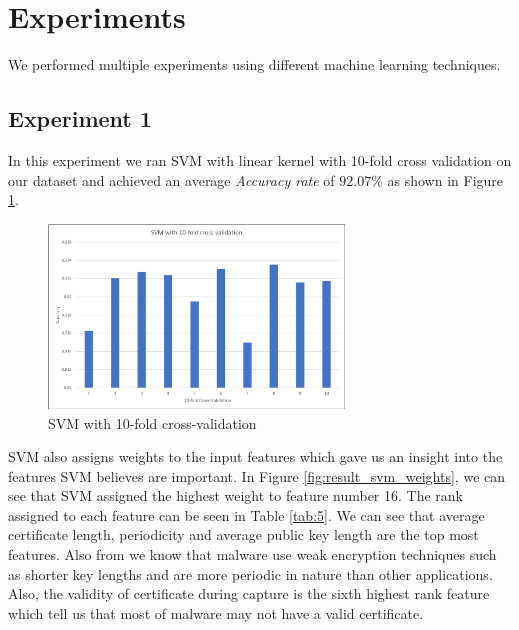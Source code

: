 \clearpage

\section{Experiments}

We performed multiple experiments using different machine learning techniques.

\subsection{Experiment 1}

In this experiment we ran SVM with linear kernel with 10-fold cross validation on our dataset and achieved an average \emph{Accuracy rate} of $92.07$\% as shown in Figure \ref{fig:result_svm}.

\begin{figure}[htb]
	\centering
	\includegraphics[width=0.7\textwidth]{images/svm.png}
	\caption{SVM with 10-fold cross-validation} 
	\label{fig:result_svm}
\end{figure}

SVM also assigns weights to the input features which gave us an insight into the features SVM believes are important. In Figure \ref{fig:result_svm_weights}, we can see that SVM assigned the highest weight to feature number 16. The rank assigned to each feature can be seen in Table \ref{tab:5}. We can see that average certificate length, periodicity and average public key length are the top most features. Also from \cite{AndersonM16} we know that malware use weak encryption techniques such as shorter key lengths and are more periodic in nature than other applications. Also, the validity of certificate during capture is the sixth highest rank feature which tell us that most of malware may not have a valid certificate.

